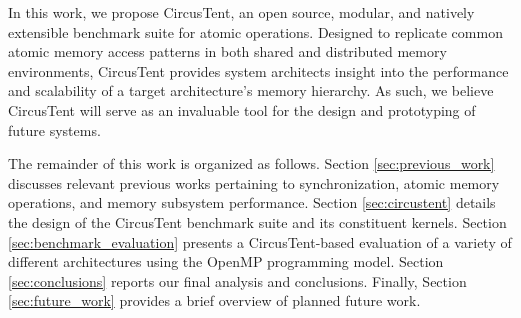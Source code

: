 
In this work, we propose CircusTent, an open source, modular, and natively extensible benchmark suite for atomic operations.
Designed to replicate common atomic memory access patterns in both shared and distributed memory environments, CircusTent provides system architects insight into the performance and scalability of a target architecture's memory hierarchy.
As such, we believe CircusTent will serve as an invaluable tool for the design and prototyping of future systems.

The remainder of this work is organized as follows.
Section \ref{sec:previous_work} discusses relevant previous works pertaining to synchronization, atomic memory operations, and memory subsystem performance.
Section \ref{sec:circustent} details the design of the CircusTent benchmark suite and its constituent kernels.
Section \ref{sec:benchmark_evaluation} presents a CircusTent-based evaluation of a variety of different architectures using the OpenMP programming model.
Section \ref{sec:conclusions} reports our final analysis and conclusions.
Finally, Section \ref{sec:future_work} provides a brief overview of planned future work.

